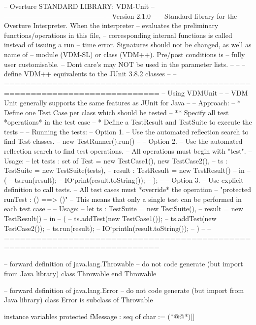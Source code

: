 \documentclass[a4paper]{article}
\begin{document}
\title{}
\author{}
\begin{vdm_al}
--  Overture STANDARD LIBRARY: VDM-Unit
--      --------------------------------------------
-- Version 2.1.0 
--
-- Standard library for the Overture Interpreter. When the interpreter
-- evaluates the preliminary functions/operations in this file,
-- corresponding internal functions is called instead of issuing a run
-- time error. Signatures should not be changed, as well as name of
-- module (VDM-SL) or class (VDM++). Pre/post conditions is 
-- fully user customisable. 
-- Dont care's may NOT be used in the parameter lists.
--  
--
-- define VDM++ equivalents to the JUnit 3.8.2 classes
--
--===========================================================================
-- Using VDMUnit
--
-- VDM Unit generally supports the same features as JUnit for Java
--
-- Approach:
-- * Define one Test Case per class which should be tested
-- ** Specify all test *operations* in the test case
-- * Define a TestResult and TestSuite to execute the tests
--
-- Running the tests:
-- Option 1.
-- Use the automated reflection search to find Test classes.
--  new TestRunner().run()
--
-- Option 2.
-- Use the automated reflection search to find test operations.
--  All operations must begin with "test".
--  Usage:
--      let tests : set of Test = {new TestCase1(), new TestCase2()},
--          ts : TestSuite = new TestSuite(tests),
--          result : TestResult = new TestResult()
--      in
--      (
--          ts.run(result);
--          IO`print(result.toString());
--      );
--
-- Option 3.
-- Use explicit definition to call tests.
--  All test cases must *override* the operation 
--      "protected runTest : () ==> ()"
--  This means that only a single test can be performed in each test case
--
-- Usage:
--      let ts : TestSuite = new TestSuite(),
--          result = new TestResult() 
--      in
--      (
--          ts.addTest(new TestCase1());
--          ts.addTest(new TestCase2());
--          ts.run(result);
--          IO`println(result.toString());
--      )
--
--===========================================================================



-- forward definition of java.lang.Throwable
-- do not code generate (but import from Java library)
class Throwable
end Throwable

-- forward definition of java.lang.Error
-- do not code generate (but import from Java library)
class Error is subclass of Throwable

instance variables
  protected fMessage : seq of char := (*@\vdmnotcovered{}@*)[]
  

\end{vdm_al}
\end{document}
